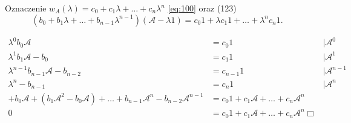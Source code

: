 \documentclass[../main.tex]{subfiles}
\begin{document}
\begin{dowod}
Oznaczenie $w_A(\lambda) = c_0 + c_1 \lambda + \ldots + c_n \lambda^n$
\ref{eq:100} oraz (123) \[
    (b_0+b_1 \lambda + \ldots + b_{n-1}\lambda^{n-1})(\mathcal{A} - \lambda 1) = c_0 1 + \lambda c_1 1 + \ldots + \lambda^n c_n 1
.\]

\begin{align*}
    \lambda^0 b_0 \mathcal{A} &= c_0 1 &|\mathcal{A}^0\\
    \lambda^1 b_1 \mathcal{A} - b_0 &= c_1 1 &|\mathcal{A}^1\\
    \lambda^{n-1} b_{n-1} \mathcal{A} - b_{n-2} &= c_{n-1} 1 &|\mathcal{A}^{n-1}\\
    \lambda^n - b_{n-1} &= c_n 1 &|\mathcal{A}^n\\
    + b_0 \mathcal{A} + (b_1 \mathcal{A}^2 - b_0 \mathcal{A}) + \ldots + b_{n-1}\mathcal{A}^n - b_{n-2}\mathcal{A}^{n-1} &= c_0 1 + c_1 \mathcal{A} + \ldots + c_n \mathcal{A}^n\\
    0 &= c_0 1 + c_1 \mathcal{A} + \ldots + c_n \mathcal{A}^n\Box
\end{align*}
\end{dowod}
\end{document}
